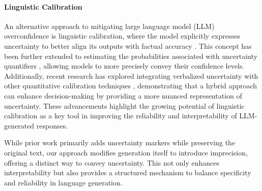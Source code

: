 \paragraph{Linguistic Calibration} An alternative approach to mitigating large language model (LLM) overconfidence is linguistic calibration, where the model explicitly expresses uncertainty to better align its outputs with factual accuracy \citep{mielek2022reducing}. This concept has been further extended to estimating the probabilities associated with uncertainty quantifiers \citep{wang2024calibrating}, allowing models to more precisely convey their confidence levels. Additionally, recent research has explored integrating verbalized uncertainty with other quantitative calibration techniques \citep{band2024linguistic, zhao2021calibrating}, demonstrating that a hybrid approach can enhance decision-making by providing a more nuanced representation of uncertainty. These advancements highlight the growing potential of linguistic calibration as a key tool in improving the reliability and interpretability of LLM-generated responses.

While prior work primarily adds uncertainty markers while preserving the original text, our approach modifies generation itself to introduce imprecision, offering a distinct way to convey uncertainty. This not only enhances interpretability but also provides a structured mechanism to balance specificity and reliability in language generation.
